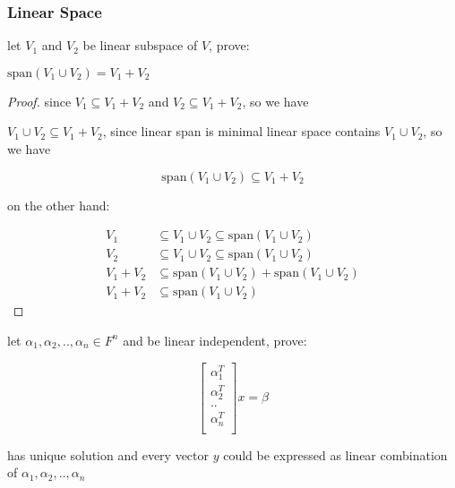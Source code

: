 \subsubsection{Linear Space}

\begin{exercise}
    let $V_1$ and $V_2$ be linear subspace of $V$, prove:

    $\mathrm{span}(V_1 \cup V_2) = V_1 + V_2$
\end{exercise}

\begin{proof}
    since $V_1 \subseteq V_1 + V_2$ and $V_2 \subseteq V_1 + V_2$, so we have

    $V_1 \cup V_2 \subseteq V_1 + V_2$, since linear span is minimal linear space contains $V_1 \cup V_2$,
    so we have

    \[
        \mathrm{span}(V_1 \cup V_2) \subseteq V_1 + V_2
    \]

    on the other hand:

    \begin{align*}
        V_1 &\subseteq V_1 \cup V_2  \subseteq \mathrm{span}(V_1 \cup V_2) \\
        V_2 &\subseteq V_1 \cup V_2  \subseteq \mathrm{span}(V_1 \cup V_2) \\
        V_1 + V_2 & \subseteq \mathrm{span}(V_1 \cup V_2) + \mathrm{span}(V_1 \cup V_2) \\
        V_1 + V_2 & \subseteq \mathrm{span}(V_1 \cup V_2)
    \end{align*}
\end{proof}

\begin{exercise}
    let $\alpha_1, \alpha_2, .. , \alpha_n \in F^n$ and be linear independent, prove:

    \[
        \begin{bmatrix}
            \alpha_1^T \\
            \alpha_2^T \\
            .. \\
            \alpha_n^T \\
        \end{bmatrix} x = \beta
    \]

    has unique solution and every vector $y$ could be expressed as linear combination of $\alpha_1, \alpha_2, .. ,  \alpha_n$
\end{exercise}

